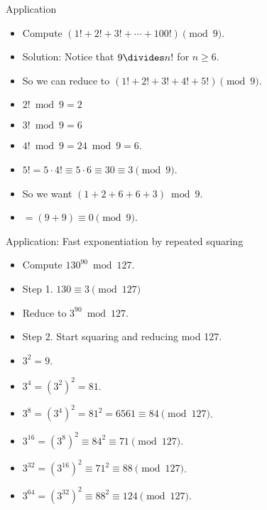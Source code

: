 \documentclass[handout]{beamer}
\begin{document}
\begin{frame}{Application}
\begin{itemize}
  \item Compute $(1! + 2! + 3! + \cdots + 100!) \pmod 9$.
  \item Solution: Notice that $9\divides n!$ for $n\geq 6$.
  \item So we can reduce to $(1! + 2! + 3! + 4! + 5!) \pmod 9$.
  \item $2! \bmod 9 = 2$
  \item $3! \bmod 9 = 6$
  \item $4! \bmod 9 = 24 \bmod 9 = 6$.
  \item $5! = 5 \cdot 4! \equiv 5 \cdot 6 \equiv 30 \equiv 3 \pmod 9$.
  \item So we want $(1 + 2 + 6 + 6 + 3) \bmod 9$.
  \item $=(9+9) \equiv 0 \pmod 9$.
\end{itemize}
\end{frame}


\begin{frame}{Application: Fast exponentiation by repeated squaring}
\begin{itemize}
  \item Compute $130^{90} \bmod 127$.
  \item Step 1. $130 \equiv 3 \pmod {127}$
  \item Reduce to $3^{90} \bmod 127$.
  \item Step 2. Start squaring and reducing mod 127.
  \item $3^2 = 9$.
  \item $3^4 = (3^2)^2 = 81$.
  \item $3^{8} = (3^4)^2 = 81^2 = 6561   \equiv 84  \pmod {127}$.
  \item $3^{16} = (3^{8})^2 \equiv 84^2  \equiv 71  \pmod {127}$.
  \item $3^{32} = (3^{16})^2 \equiv 71^2 \equiv 88  \pmod {127}$.
  \item $3^{64} = (3^{32})^2 \equiv 88^2 \equiv 124 \pmod {127}$.
\end{itemize}
\end{frame}
\end{document}
